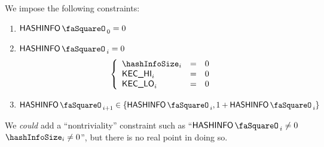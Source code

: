 We impose the following constraints:
\begin{enumerate}
	\item $\hashInfoStamp_{0} = 0$
	\item \If $\hashInfoStamp_{i} = 0$ \Then 
		\[
			\left\{ \begin{array}{lcl}
				\hashInfoSize      _{i} & = & 0 \\
				\hashInfoValHi     _{i} & = & 0 \\
				\hashInfoValLo     _{i} & = & 0 \\
			\end{array} \right.
		\]
	\item $\hashInfoStamp_{i + 1} \in \{ \hashInfoStamp_{i}, 1 + \hashInfoStamp_{i} \}$
\end{enumerate}
\saNote{} We \emph{could} add a ``nontriviality'' constraint such as ``\If $\hashInfoStamp_{i} \neq 0$ \Then $\hashInfoSize_{i} \neq 0$'', but there is no real point in doing so.
